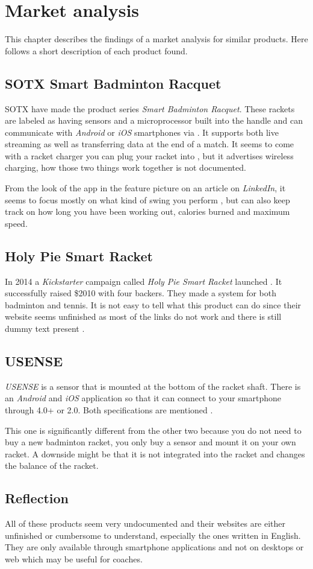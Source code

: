 \chapter{Market analysis}
This chapter describes the findings of a market analysis for similar products. 
Here follows a short description of each product found.

\section*{SOTX Smart Badminton Racquet}
SOTX have made the product series \textit{Smart Badminton Racquet}. 
These rackets are labeled as having sensors and a microprocessor built into the handle and can communicate with \textit{Android} or \textit{iOS} smartphones via   \citep{marketAnalysis:sotxsite}. 
It supports both live streaming as well as transferring data at the end of a match. 
It seems to come with a racket charger you can plug your racket into \citep{marketAnalysis:sotxhw}, but it advertises wireless charging, how those two things work together is not documented.

From the look of the app in the feature picture on an article on \textit{LinkedIn}, it seems to focus mostly on what kind of swing you perform \citep{marketAnalysis:sotxapp}, but can also keep track on how long you have been working out, calories burned and maximum speed.

\section*{Holy Pie Smart Racket}
In 2014 a \textit{Kickstarter} campaign called \textit{Holy Pie Smart Racket} launched \citep{marketAnalysis:holypie}. 
It successfully raised \$2010 with four backers. 
They made a system for both badminton and tennis. 
It is not easy to tell what this product can do since their website seems unfinished as most of the links do not work and there is still dummy text present \citep{marketAnalysis:holypi}.

\section*{USENSE}
\textit{USENSE} is a sensor that is mounted at the bottom of the racket shaft. 
There is an \textit{Android} and \textit{iOS} application so that it can connect to your smartphone through  4.0+ or 2.0. 
Both specifications are mentioned \citep{marketAnalysis:usense}.
 
This one is significantly different from the other two because you do not need to buy a new badminton racket, you only buy a sensor and mount it on your own racket. 
A downside might be that it is not integrated into the racket and changes the balance of the racket.

\section*{Reflection}
All of these products seem very undocumented and their websites are either unfinished or cumbersome to understand, especially the ones written in English. 
They are only available through smartphone applications and not on desktops or web which may be useful for coaches.
